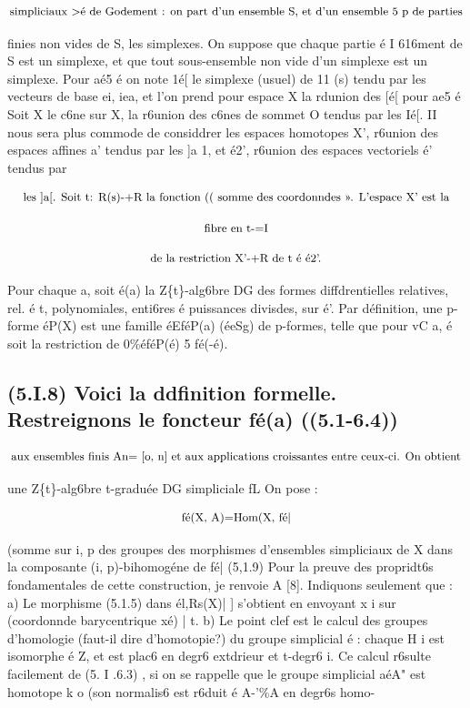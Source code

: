 \documentclass[11pt]{article}
\theoremstyle{remark}
\begin{document}
\[\text{\small simpliciaux >é de Godement : on part d'un ensemble S, et d'un ensemble 5 p de parties}\]

finies non vides de S, les simplexes. On suppose que chaque partie é I 616ment de S est un simplexe, et que tout sous-ensemble non vide d'un simplexe est un simplexe. Pour aé5 é on note 1é[ le simplexe (usuel) de 11 (s) tendu par les vecteurs de base ei, iea, et l'on prend pour espace X la rdunion des [é[ pour ae5 é Soit X le c6ne sur X, la r6union des c6nes de sommet O tendus par les Ié[. II nous sera plus commode de considdrer les espaces homotopes X', r6union des espaces affines a' tendus par les ]a 1, et é2', r6union des espaces vectoriels é' tendus par

\[\text{\small les ]a[. Soit t: R(s)-+R la fonction (( somme des coordonndes >>. L'espace X' est la}\]

\[\text{\small fibre en t-=I}\]

\[\text{\small de la restriction X'-+R de t é é2'.}\]

Pour chaque a, soit é(a) la Z\{t\}-alg6bre DG des formes diffdrentielles relatives, rel. é t, polynomiales, enti6res é puissances divisdes, sur é'. Par définition, une p-forme éP(X) est une famille éEféP(a) (éeSg) de p-formes, telle que pour vC a, é soit la restriction de 0\%éféP(é) 5 fé(-é).

\subsection*{(5.I.8) Voici la ddfinition formelle. Restreignons le foncteur fé(a) ((5.1-6.4))}

\[\text{\small aux ensembles finis An= [o, n] et aux applications croissantes entre ceux-ci. On obtient}\]

une Z\{t\}-alg6bre t-graduée DG simpliciale fL On pose :

\[\text{\small fé(X, A)=Hom(X, fé|}\]

(somme sur i, p des groupes des morphismes d'ensembles simpliciaux de X dans la composante (i, p)-bihomogéne de fé| (5,1.9) Pour la preuve des propridt6s fondamentales de cette construction, je renvoie A [8]. Indiquons seulement que : a) Le morphisme (5.1.5) dans él,Rs(X)| ] s'obtient en envoyant x i sur (coordonnde barycentrique xé) | t. b) Le point clef est le calcul des groupes d'homologie (faut-il dire d'homotopie?) du groupe simplicial é : chaque H i est isomorphe é Z, et est plac6 en degr6 extdrieur et t-degr6 i. Ce calcul r6sulte facilement de (5. I .6.3) , si on se rappelle que le groupe simplicial aéA" est homotope k o (son normalis6 est r6duit é A-'\%A en degr6s homo-
\end{document}
